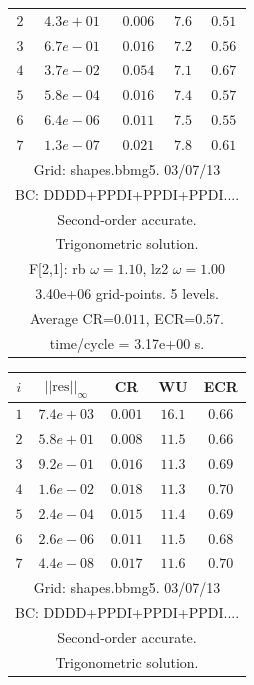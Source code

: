\begin{table}[hbt]
\begin{center}
{\begin{tabular}{|c|c|c|c|c|}
 $ 2$  & $ 4.3e+01$ & $0.006$ & $ 7.6$ & $0.51$ \\ 
 $ 3$  & $ 6.7e-01$ & $0.016$ & $ 7.2$ & $0.56$ \\ 
 $ 4$  & $ 3.7e-02$ & $0.054$ & $ 7.1$ & $0.67$ \\ 
 $ 5$  & $ 5.8e-04$ & $0.016$ & $ 7.4$ & $0.57$ \\ 
 $ 6$  & $ 6.4e-06$ & $0.011$ & $ 7.5$ & $0.55$ \\ 
 $ 7$  & $ 1.3e-07$ & $0.021$ & $ 7.8$ & $0.61$ \\ 
\hline 
\multicolumn{5}{|c|}{Grid: shapes.bbmg5. 03/07/13}  \\
\multicolumn{5}{|c|}{BC: DDDD+PPDI+PPDI+PPDI....}  \\
\multicolumn{5}{|c|}{Second-order accurate.}  \\
\multicolumn{5}{|c|}{Trigonometric solution.}  \\
\multicolumn{5}{|c|}{F[2,1]: rb $\omega=1.10$, lz2 $\omega=1.00$}  \\
\multicolumn{5}{|c|}{3.40e+06 grid-points. 5 levels.}  \\
\multicolumn{5}{|c|}{Average CR=$0.011$, ECR=$0.57$.}  \\
\multicolumn{5}{|c|}{time/cycle = 3.17e+00 s.}  \\
\hline 
\end{tabular}
\begin{tabular}{|c|c|c|c|c|} \hline 
 $i$   & $\vert\vert\mbox{res}\vert\vert_\infty$  &  CR     &  WU    & ECR  \\   \hline 
 $ 1$  & $ 7.4e+03$ & $0.001$ & $16.1$ & $0.66$ \\ 
 $ 2$  & $ 5.8e+01$ & $0.008$ & $11.5$ & $0.66$ \\ 
 $ 3$  & $ 9.2e-01$ & $0.016$ & $11.3$ & $0.69$ \\ 
 $ 4$  & $ 1.6e-02$ & $0.018$ & $11.3$ & $0.70$ \\ 
 $ 5$  & $ 2.4e-04$ & $0.015$ & $11.4$ & $0.69$ \\ 
 $ 6$  & $ 2.6e-06$ & $0.011$ & $11.5$ & $0.68$ \\ 
 $ 7$  & $ 4.4e-08$ & $0.017$ & $11.6$ & $0.70$ \\ 
\hline 
\multicolumn{5}{|c|}{Grid: shapes.bbmg5. 03/07/13}  \\
\multicolumn{5}{|c|}{BC: DDDD+PPDI+PPDI+PPDI....}  \\
\multicolumn{5}{|c|}{Second-order accurate.}  \\
\multicolumn{5}{|c|}{Trigonometric solution.}  \\

\end{tabular}}
\end{center}
\end{table}
